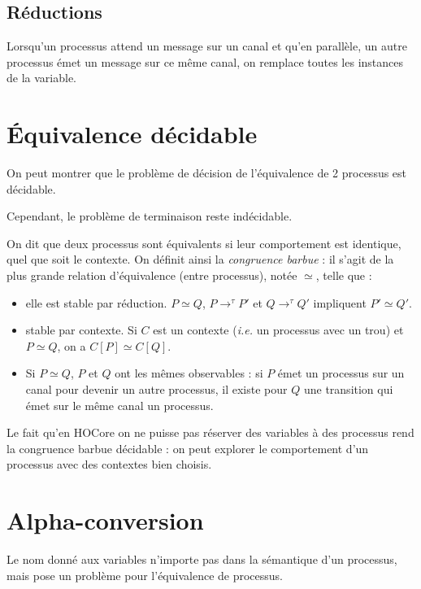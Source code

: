\documentclass{article}
\def\barbue{\simeq}
\begin{document}
\subsection{Réductions}
Lorsqu'un processus attend un message sur un canal et qu'en parallèle, un autre processus émet un message sur ce même canal, on remplace toutes les instances de la variable.




\section{Équivalence décidable}
On peut montrer que le problème de décision de l'équivalence de 2 processus est décidable.

Cependant, le problème de terminaison reste indécidable.

On dit que deux processus sont équivalents si leur comportement est identique, quel que soit le contexte. On définit ainsi la \textit{congruence barbue} : il s'agit de la plus grande relation d'équivalence (entre processus), notée $\barbue$, telle que :
\begin{itemize}
\item elle est stable par réduction. $P\barbue Q$, $P\rightarrow^\tau P'$ et $Q\rightarrow^\tau Q'$ impliquent $P'\barbue Q'$.
\item stable par contexte. Si $C$ est un contexte (\textit{i.e.} un processus avec un trou) et $P\barbue Q$, on a $C[P]\barbue C[Q]$. 
\item Si $P\barbue Q$, $P$ et $Q$ ont les mêmes observables : si $P$ émet un processus sur un canal pour devenir un autre processus, il existe pour $Q$ une transition qui émet sur le même canal un processus.
\end{itemize}

Le fait qu'en HOCore on ne puisse pas réserver des variables à des processus rend la congruence barbue décidable : on peut explorer le comportement d'un processus avec des contextes bien choisis.

\section{Alpha-conversion}
Le nom donné aux variables n'importe pas dans la sémantique d'un processus, mais pose un problème pour l'équivalence de processus.

\end{document}
